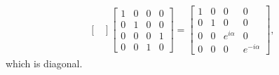 \documentclass[en]{sol-man}
\begin{document}
\begin{pf}
\begin{pf}
\begin{align}
\begin{bmatrix}
            \end{bmatrix}\begin{bmatrix}
                1&0&0&0\\
                0&1&0&0\\
                0&0&0&1\\
                0&0&1&0
            \end{bmatrix}=\begin{bmatrix}
                1&0&0&0\\
                0&1&0&0\\
                0&0&e^{i\alpha}&0\\
                0&0&0&e^{-i\alpha}
            \end{bmatrix},
        \end{align}
        which is diagonal.
    \end{pf}
\end{pf}
\end{document}
